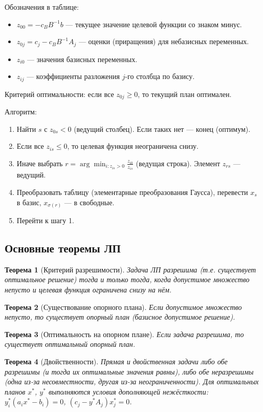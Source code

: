 \documentclass{article}
\theoremstyle{plain}
\newtheorem{theorem}{Теорема}[section]
\begin{document}
Обозначения в таблице:
\begin{itemize}
  \item $z_{00} = -c_B B^{-1} b$ — текущее значение целевой функции со знаком минус.
  \item $z_{0j} = c_j - c_B B^{-1} A_j$ — оценки (приращения) для небазисных переменных.
  \item $z_{i0}$ — значения базисных переменных.
  \item $z_{ij}$ — коэффициенты разложения $j$-го столбца по базису.
\end{itemize}

Критерий оптимальности: если все $z_{0j} \ge 0$, то текущий план оптимален.

Алгоритм:
\begin{enumerate}
\item Найти $s$ с $z_{0s} < 0$ (ведущий столбец). Если таких нет — конец (оптимум).
\item Если все $z_{is} \le 0$, то целевая функция неограничена снизу.
\item Иначе выбрать $r = \arg\min_{i: z_{is}>0} \frac{z_{i0}}{z_{is}}$ (ведущая строка). Элемент $z_{rs}$ — ведущий.
\item Преобразовать таблицу (элементарные преобразования Гаусса), перевести $x_s$ в базис, $x_{\sigma(r)}$ — в свободные.
\item Перейти к шагу 1.
\end{enumerate}

\subsection{Основные теоремы ЛП}
\begin{theorem}[Критерий разрешимости]
Задача ЛП разрешима (т.е. существует оптимальное решение) тогда и только тогда, когда допустимое множество непусто и целевая функция ограничена снизу на нём.
\end{theorem}
\begin{theorem}[Существование опорного плана]
Если допустимое множество непусто, то существует опорный план (базисное допустимое решение).
\end{theorem}
\begin{theorem}[Оптимальность на опорном плане]
Если задача разрешима, то существует оптимальный опорный план.
\end{theorem}
\begin{theorem}[Двойственности]
Прямая и двойственная задачи либо обе разрешимы (и тогда их оптимальные значения равны), либо обе неразрешимы (одна из-за несовместности, другая из-за неограниченности). Для оптимальных планов $x^*$, $y^*$ выполняются условия дополняющей нежёсткости: $y_i^*(a_i x^* - b_i) = 0$, $(c_j - y^*A_j)x_j^* = 0$.
\end{theorem}
\end{document}
